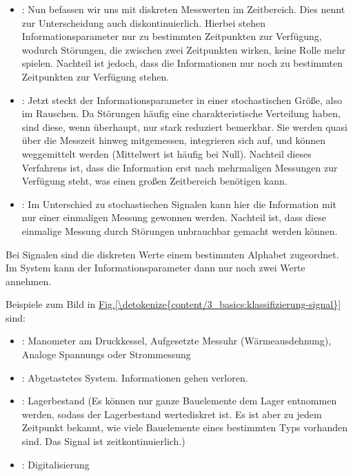 \documentclass[letterpaper,10pt,english]{jupyterBook}
\begin{document}
\begin{itemize}
\item {} 
\sphinxAtStartPar
{}: Nun befassen wir uns mit diskreten Messwerten im Zeitbereich. Dies nennt zur Unterscheidung auch diskontinuierlich. Hierbei stehen Informationsparameter nur zu bestimmten Zeitpunkten zur Verfügung, wodurch Störungen, die zwischen zwei Zeitpunkten wirken, keine Rolle mehr spielen. Nachteil ist jedoch, dass die Informationen nur noch zu bestimmten Zeitpunkten zur Verfügung stehen.

\item {} 
\sphinxAtStartPar
{}: Jetzt steckt der Informationsparameter in einer stochastischen Größe, also im Rauschen. Da Störungen häufig eine charakteristische Verteilung haben, sind diese, wenn überhaupt, nur stark reduziert bemerkbar. Sie werden quasi über die Messzeit hinweg mitgemessen, integrieren sich auf, und können weggemittelt werden (Mittelwert ist häufig bei Null). Nachteil dieses Verfahrens ist, dass die Information erst nach mehrmaligen Messungen zur Verfügung steht, was einen großen Zeitbereich benötigen kann.

\item {} 
\sphinxAtStartPar
{}: Im Unterschied zu stochastischen Signalen kann hier die Information mit nur einer einmaligen Messung gewonnen werden. Nachteil ist, dass diese einmalige Messung durch Störungen unbrauchbar gemacht werden können.

\end{itemize}

\sphinxAtStartPar
Bei  Signalen sind die diskreten Werte einem bestimmten Alphabet zugeordnet. Im  System kann der Informationsparameter dann nur noch zwei Werte annehmen.

\sphinxAtStartPar
Beispiele zum Bild in \hyperref[\detokenize{content/3_basics:klassifizierung-signal}]{Fig.\@ \ref{\detokenize{content/3_basics:klassifizierung-signal}}} sind:
\begin{itemize}
\item {} 
\sphinxAtStartPar
{}: Manometer am Druckkessel, Aufgesetzte Messuhr (Wärmeausdehnung), Analoge Spannungs\sphinxhyphen{} oder Strommessung

\item {} 
\sphinxAtStartPar
{}: Abgetastetes System. Informationen gehen verloren.

\item {} 
\sphinxAtStartPar
{}: Lagerbestand (Es können nur ganze Bauelemente dem Lager entnommen werden, sodass der Lagerbestand wertediskret ist. Es ist aber zu jedem Zeitpunkt bekannt, wie viele Bauelemente eines bestimmten Typs vorhanden sind. Das Signal ist zeitkontinuierlich.)

\item {} 
\sphinxAtStartPar
{}: Digitalisierung

\end{itemize}
\end{document}
